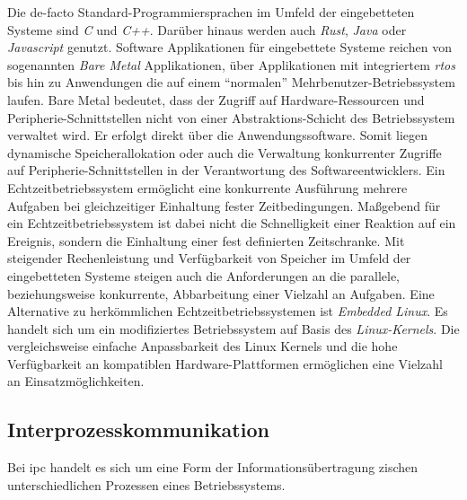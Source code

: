 Die de-facto Standard-Programmiersprachen im Umfeld der eingebetteten Systeme
sind \textit{C} und \textit{C++}.
Darüber hinaus werden auch \textit{Rust}, \textit{Java} oder
\textit{Javascript} genutzt.
\newline
Software Applikationen für eingebettete Systeme reichen von sogenannten
\textit{Bare Metal} Applikationen, über Applikationen mit integriertem
\textit{\ac{rtos}} bis hin zu Anwendungen die auf einem \enquote{normalen}
Mehrbenutzer-Betriebssystem laufen.
\newline
Bare Metal bedeutet, dass der Zugriff auf Hardware-Ressourcen und
Peripherie-Schnittstellen nicht von einer Abstraktions-Schicht des
Betriebssystem verwaltet wird.
Er erfolgt direkt über die Anwendungssoftware.
Somit liegen dynamische Speicherallokation oder auch die Verwaltung
konkurrenter Zugriffe auf Peripherie-Schnittstellen in der Verantwortung des
Softwareentwicklers.
\newline
Ein Echtzeitbetriebssystem ermöglicht eine konkurrente Ausführung mehrere
Aufgaben bei gleichzeitiger Einhaltung fester Zeitbedingungen.
Maßgebend für ein Echtzeitbetriebssystem ist dabei nicht die Schnelligkeit
einer Reaktion auf ein Ereignis, sondern die Einhaltung einer fest definierten
Zeitschranke\footnotemark[1]\cite{BSKompakt_GrundlagenBs}.
\newline
Mit steigender Rechenleistung und Verfügbarkeit von Speicher im Umfeld der
eingebetteten Systeme steigen auch die Anforderungen an die parallele,
beziehungsweise konkurrente, Abbarbeitung einer Vielzahl an Aufgaben.
Eine Alternative zu herkömmlichen Echtzeitbetriebssystemen ist \textit{Embedded
Linux}.
Es handelt sich um ein modifiziertes Betriebssystem auf Basis des
\textit{Linux-Kernels}.
Die vergleichsweise einfache Anpassbarkeit des Linux Kernels und die hohe
Verfügbarkeit an kompatiblen Hardware-Plattformen ermöglichen eine Vielzahl an
Einsatzmöglichkeiten\cite{UbuntuBlogEmbeddedLinux}.


\subsection{Interprozesskommunikation}

Bei \ac{ipc} handelt es sich um eine Form der Informationsübertragung zischen
unterschiedlichen Prozessen eines Betriebssystems.
